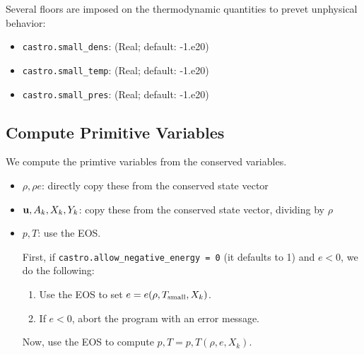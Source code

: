 Several floors are imposed on the thermodynamic quantities to prevet unphysical
behavior:
\begin{itemize}
\item {\tt castro.small\_dens}: (Real; default: -1.e20)
\item {\tt castro.small\_temp}: (Real; default: -1.e20)
\item {\tt castro.small\_pres}: (Real; default: -1.e20)
\end{itemize}


\subsection{Compute Primitive Variables}\label{Sec:Compute Primitive Variables}

We compute the primtive variables from the conserved variables.
\begin{itemize}
\item $\rho, \rho e$: directly copy these from the conserved state
  vector
\item ${\bf u}, A_k, X_k, Y_k$: copy these from the conserved state
  vector, dividing by $\rho$
\item $p,T$: use the EOS.

  First, if {\tt castro.allow\_negative\_energy = 0} (it defaults to
  1) and $e < 0$, we do the following:

  \begin{enumerate}
  \item Use the EOS to set $e = e(\rho,T_{\rm small},X_k)$.
  \item If $e < 0$, abort the program with an error message.
  \end{enumerate}
  Now, use the EOS to compute $p,T = p,T(\rho,e,X_k)$.
\end{itemize}


